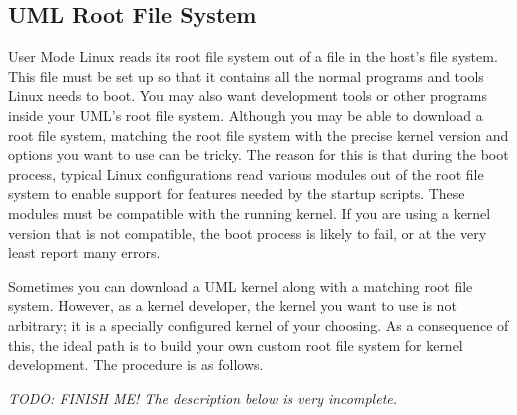 \documentclass{article}
\newcommand{\todo}[1]{\textit{TODO: #1}}
\begin{document}
\subsection{UML Root File System}

User Mode Linux reads its root file system out of a file in the host's file system. This file
must be set up so that it contains all the normal programs and tools Linux needs to boot. You
may also want development tools or other programs inside your UML's root file system. Although
you may be able to download a root file system, matching the root file system with the precise
kernel version and options you want to use can be tricky. The reason for this is that during the
boot process, typical Linux configurations read various modules out of the root file system to
enable support for features needed by the startup scripts. These modules must be compatible with
the running kernel. If you are using a kernel version that is not compatible, the boot process
is likely to fail, or at the very least report many errors.

Sometimes you can download a UML kernel along with a matching root file system. However, as a
kernel developer, the kernel you want to use is not arbitrary; it is a specially configured
kernel of your choosing. As a consequence of this, the ideal path is to build your own custom
root file system for kernel development. The procedure is as follows.

\todo{FINISH ME! The description below is very incomplete.}
\end{document}

